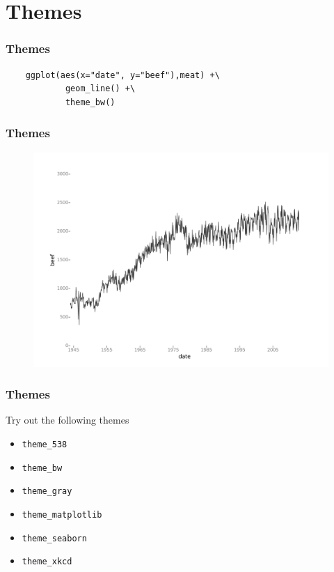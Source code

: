 \documentclass{beamer}
\begin{document}
\section{Themes}
\begin{frame}[fragile]
\frametitle{Themes}
\Large
	\begin{framed}
	\begin{verbatim}
	ggplot(aes(x="date", y="beef"),meat) +\
			geom_line() +\
			theme_bw()
	\end{verbatim}
	\end{framed}
\end{frame}
\begin{frame}
\frametitle{Themes}
\Large
\begin{figure}
\centering
\includegraphics[width=1.0\linewidth]{meat_theme_bw}
\end{figure}

\end{frame}
\begin{frame}
\frametitle{Themes}
\Large
Try out the following themes
	\begin{itemize}
		\item	\texttt{theme\_538}
		\item	\texttt{theme\_bw}
		\item	\texttt{theme\_gray}
		\item	\texttt{theme\_matplotlib}
		\item	\texttt{theme\_seaborn}
		\item	\texttt{theme\_xkcd}
	\end{itemize}
	
\end{frame}
\end{document}
